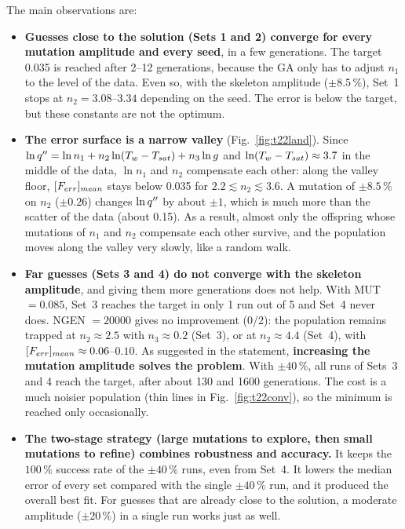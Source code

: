 The main observations are:
\begin{itemize}
  \item \textbf{Guesses close to the solution (Sets 1 and 2) converge for every mutation amplitude and every
        seed}, in a few generations. The target 0.035 is reached after 2--12 generations, because the GA
        only has to adjust $n_1$ to the level of the data. Even so, with the skeleton amplitude
        ($\pm8.5\,\%$), Set~1 stops at $n_2=3.08$--$3.34$ depending on the seed. The error is below the target,
        but these constants are not the optimum.
  \item \textbf{The error surface is a narrow valley} (Fig.~\ref{fig:t22land}). Since
        $\ln q''=\ln n_1+n_2\ln(T_w-T_{sat})+n_3\ln g$ and $\ln(T_w-T_{sat})\approx3.7$ in the middle of the data,
        $\ln n_1$ and $n_2$ compensate each other: along the valley floor, $[F_{err}]_{mean}$ stays below 0.035
        for $2.2\lesssim n_2\lesssim3.6$. A mutation of $\pm8.5\,\%$ on $n_2$ ($\pm0.26$) changes $\ln q''$
        by about $\pm1$, which is much more than the scatter of the data (about 0.15). As a result, almost only
        the offspring whose mutations of $n_1$ and $n_2$ compensate each other survive, and the population
        moves along the valley very slowly, like a random walk.
  \item \textbf{Far guesses (Sets 3 and 4) do not converge with the skeleton amplitude}, and giving
        them more generations does not help. With MUT $=0.085$, Set~3 reaches the target in only 1 run
        out of 5 and Set~4 never does. NGEN $=20000$ gives no improvement (0/2): the population remains trapped at $n_2\approx2.5$ with $n_3\approx0.2$
        (Set~3), or at $n_2\approx4.4$ (Set~4), with $[F_{err}]_{mean}\approx0.06$--$0.10$. As suggested in the statement, \textbf{increasing the mutation
        amplitude solves the problem}. With $\pm40\,\%$, all runs of Sets~3 and 4 reach the target, after
        about 130 and 1600 generations. The cost is a much noisier population (thin lines in
        Fig.~\ref{fig:t22conv}), so the minimum is reached only occasionally.
  \item \textbf{The two-stage strategy (large mutations to explore, then small mutations to refine)
        combines robustness and accuracy.} It keeps the $100\,\%$ success rate of the $\pm40\,\%$ runs,
        even from Set~4. It lowers the median error of every set compared with the single $\pm40\,\%$ run,
        and it produced the overall best fit. For guesses that are already close to the solution, a
        moderate amplitude ($\pm20\,\%$) in a single run works just as well.
\end{itemize}

